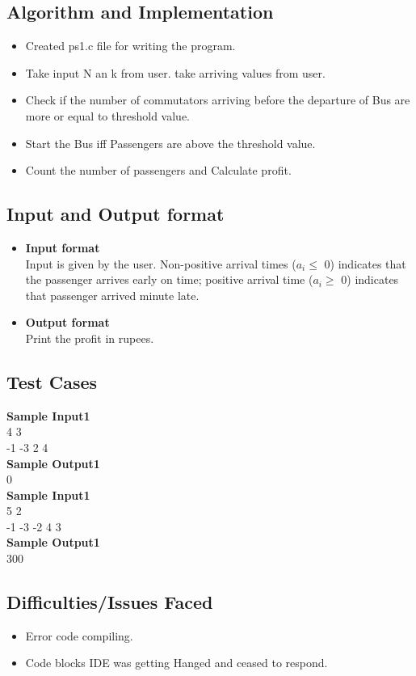 \documentclass[a4paper,12pt]{article}
\begin{document}
\subsection{Algorithm and Implementation}
\begin{itemize}
\item Created ps1.c file for writing the program.
\item Take input N an k from user. take arriving values from user.
\item Check if the number of commutators arriving before the departure of Bus are more or equal to threshold value.
\item Start the Bus iff Passengers are above the threshold value.
\item Count the number of passengers and Calculate profit.
\end{itemize}
\subsection{Input and Output format}
\begin{itemize}
\item \textbf{Input format} \\
Input is given by the user. Non-positive arrival times ($a_i \leqslant$ 0) indicates that the passenger arrives early on time; positive arrival time ($a_i \geqslant$ 0) indicates that passenger arrived minute late.
\item \textbf{Output format}\\
Print the profit in rupees.\\
\end{itemize}
\subsection{Test Cases}
\textbf{Sample Input1}\\
4 3 \\
-1 -3 2 4 \\
\textbf{Sample Output1} \\
0\\
\textbf{Sample Input1} \\
5 2 \\
-1 -3 -2 4 3 \\
\textbf{Sample Output1} \\
300 \\

\subsection{Difficulties/Issues Faced}
\begin{itemize}
\item Error code compiling.
\item Code blocks IDE was getting Hanged and ceased to respond.

\end{itemize}
\end{document}
